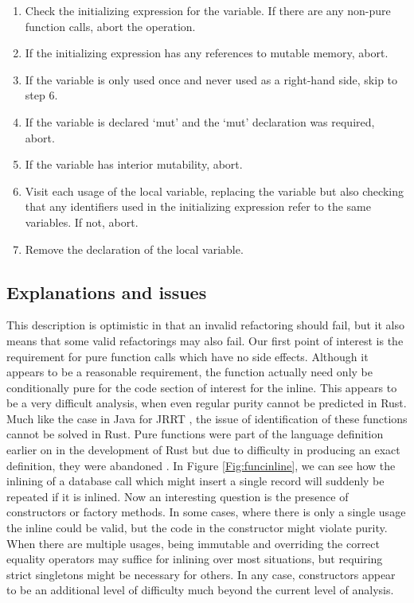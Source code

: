\begin{enumerate} 
\item Check the initializing expression for the variable. If there are any non-pure function calls, abort the operation.
\item If the initializing expression has any references to mutable memory, abort.
\item If the variable is only used once and never used as a right-hand side, skip to step 6.
\item If the variable is declared `mut' and the `mut' declaration was required, abort.
\item If the variable has interior mutability, abort.
\item Visit each usage of the local variable, replacing the variable but also checking that any identifiers used in the initializing expression refer to the same variables. If not, abort.
\item Remove the declaration of the local variable.
\end{enumerate}

\subsection{Explanations and issues}\label{S:inlineissues}
This description is optimistic in that an invalid refactoring should fail, but it also means that some valid refactorings may also fail. Our first point of interest is the requirement for pure function calls which have no side effects. Although it appears to be a reasonable requirement, the function actually need only be conditionally pure for the code section of interest for the inline. This appears to be a very difficult analysis, when even regular purity cannot be predicted in Rust. Much like the case in Java for JRRT \cite{schafer2010specification}, the issue of identification of these functions cannot be solved in Rust. Pure functions were part of the language definition earlier on in the development of Rust but due to difficulty in producing an exact definition, they were abandoned \cite{pwalton}. In Figure \ref{Fig:funcinline}, we can see how the inlining of a database call which might insert a single record will suddenly be repeated if it is inlined. Now an interesting question is the presence of constructors or factory methods. In some cases, where there is only a single usage the inline could be valid, but the code in the constructor might violate purity. When there are multiple usages, being immutable and overriding the correct equality operators may suffice for inlining over most situations, but requiring strict singletons might be necessary for others. In any case, constructors appear to be an additional level of difficulty much beyond the current level of analysis.

